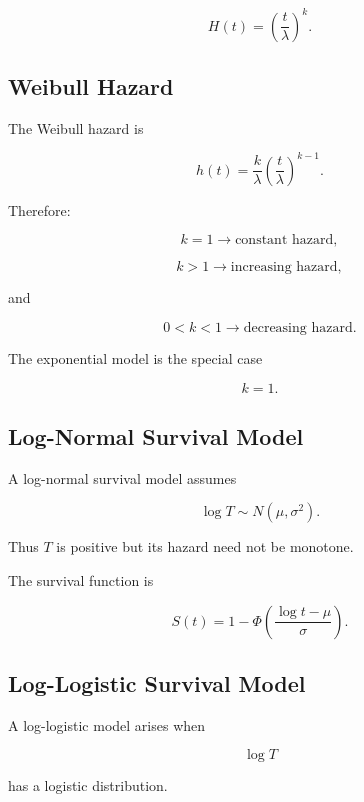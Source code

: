 \[
\boxed{
H(t)
=
\left(
\frac{t}{\lambda}
\right)^k.
}
\]

\subsection{Weibull Hazard}
\label{subsec:weibull-hazard}

The Weibull hazard is

\[
\boxed{
h(t)
=
\frac{k}{\lambda}
\left(
\frac{t}{\lambda}
\right)^{k-1}.
}
\]

Therefore:

\[
\boxed{
k=1
\rightarrow
\text{constant hazard},
}
\]

\[
\boxed{
k>1
\rightarrow
\text{increasing hazard},
}
\]

and

\[
\boxed{
0<k<1
\rightarrow
\text{decreasing hazard}.
}
\]

The exponential model is the special case

\[
\boxed{
k=1.
}
\]

\subsection{Log-Normal Survival Model}
\label{subsec:lognormal-survival}

A log-normal survival model assumes

\[
\boxed{
\log T
\sim
N(\mu,\sigma^2).
}
\]

Thus \(T\) is positive but its hazard need not be monotone.

The survival function is

\[
\boxed{
S(t)
=
1
-
\Phi
\left(
\frac{
\log t-\mu
}{
\sigma
}
\right).
}
\]

\subsection{Log-Logistic Survival Model}
\label{subsec:loglogistic-survival}

A log-logistic model arises when

\[
\log T
\]

has a logistic distribution.


